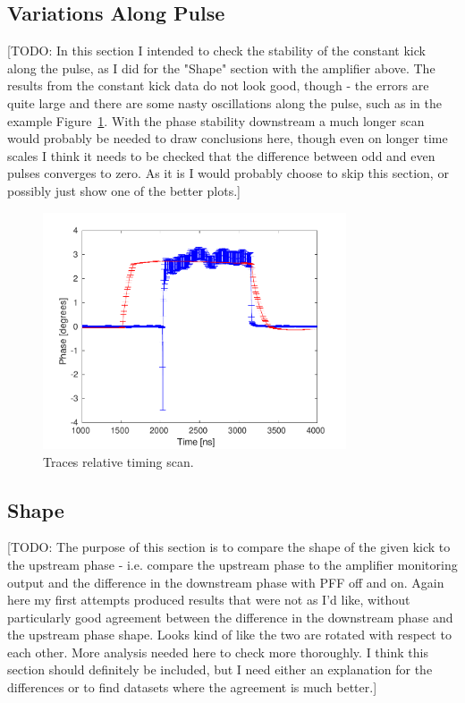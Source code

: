 \subsection{Variations Along Pulse}
\label{ss:kickPulseVar}

[TODO: In this section I intended to check the stability of the constant kick along the pulse, as I did for the "Shape" section with the amplifier above. The results from the constant kick data do not look good, though - the errors are quite large and there are some nasty oscillations along the pulse, such as in the example Figure~\ref{f:phaseShiftAlongConstKick}. With the phase stability downstream a much longer scan would probably be needed to draw conclusions here, though even on longer time scales I think it needs to be checked that the difference between odd and even pulses converges to zero. As it is I would probably choose to skip this section, or possibly just show one of the better plots.]

\begin{figure}
  \centering
  \includegraphics[width=0.8\textwidth]{Figures/commissioning/phaseShiftAlong}
  \caption{Traces relative timing scan.}
  \label{f:phaseShiftAlongConstKick}
\end{figure}

\subsection{Shape}
\label{ss:kickShape}

[TODO: The purpose of this section is to compare the shape of the given kick to the upstream phase - i.e. compare the upstream phase to the amplifier monitoring output and the difference in the downstream phase with PFF off and on. Again here my first attempts produced results that were not as I'd like, without particularly good agreement between the difference in the downstream phase and the upstream phase shape. Looks kind of like the two are rotated with respect to each other. More analysis needed here to check more thoroughly. I think this section should definitely be included, but I need either an explanation for the differences or to find datasets where the agreement is much better.]

